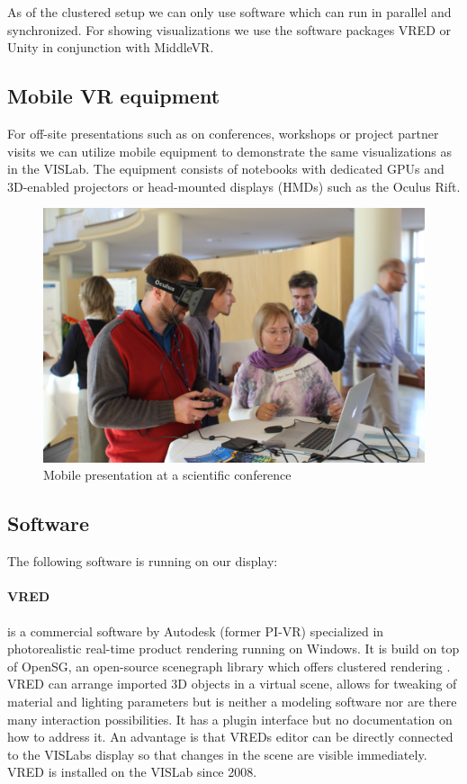 As of the clustered setup we can only use software which can run in
parallel and synchronized. For showing visualizations we use the
software packages VRED or Unity in conjunction with MiddleVR.

\subsection{Mobile VR equipment}
\label{mobile-vr-equipment}

For off-site presentations such as on conferences, workshops or project
partner visits we can utilize mobile equipment to demonstrate the same
visualizations as in the VISLab. The equipment consists of notebooks
with dedicated GPUs and 3D-enabled projectors or head-mounted displays
(HMDs) such as the Oculus Rift.

\begin{figure}
  \includegraphics[width=\linewidth]{images/rift.jpg}
\caption{Mobile presentation at a scientific conference}
\label{fig:rift}
\end{figure}

\subsection{Software}
\label{software}

The following software is running on our display:

\paragraph{VRED}
is a commercial software by Autodesk (former PI-VR) specialized in
photorealistic real-time product rendering running on Windows. It is
build on top of OpenSG, an open-source scenegraph library which offers
clustered rendering \cite{roth:05}. VRED can arrange imported 3D
objects in a virtual scene, allows for tweaking of material and lighting
parameters but is neither a modeling software nor are there many
interaction possibilities. It has a plugin interface but no
documentation on how to address it. An advantage is that VREDs editor
can be directly connected to the VISLabs display so that changes in the
scene are visible immediately. VRED is installed on the VISLab since
2008.

